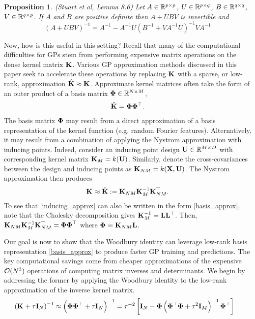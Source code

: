 \documentclass[12pt]{article}
\newtheorem{prop}{Proposition}
\begin{document}
\begin{prop} (Stuart et al, Lemma 8.6) \label{Woodbury}
Let $A \in \R^{p \times p}$, $U \in \R^{p \times q}$, $B \in \R^{q \times q}$, $V \in \R^{q \times p}$. If $A$ and $B$ are positive definite then $A + UBV$ is invertible 
and 
\[(A + UBV)^{-1} = A^{-1} - A^{-1} U\left(B^{-1} + VA^{-1}U\right)^{-1}VA^{-1}\]
\end{prop}
Now, how is this useful in this setting? Recall that many of the computational difficulties for GPs stem from performing expensive matrix operations on the dense 
kernel matrix $\kerMat$. Various GP approximation methods discussed in this paper seek to accelerate these operations by replacing $\kerMat$
with a sparse, or low-rank, approximation $\kerMatApprox \approx \kerMat$. Approximate kernel matrices often take the form of an outer product of a basis matrix 
$\kerBasisMat \in \R^{\Ndesign \times \NpseudoData}$,
\begin{align}
\kerMatApprox = \kerBasisMat \kerBasisMat^\top. \label{basis_approx}
\end{align}
The basis matrix $\kerBasisMat$ may result from a direct approximation of a basis representation of the kernel function (e.g. random Fourier features). Alternatively, it may result 
from a combination of applying the Nystrom approximation with inducing points. Indeed, consider an inducing point design $\designMatInducing \in \R^{\NpseudoData \times \inputDim}$ 
with corresponding kernel matrix $\kerMatInducing = \GPKer(\designMatInducing)$. Similarly, denote the cross-covariances between the design and inducing points as 
$\crossCovInducing = \GPKer(\designMat, \designMatInducing)$. The Nystrom approximation then produces
\begin{align}
\kerMat \approx \kerMatApprox := \crossCovInducing \kerMatInducing^{-1} \crossCovInducing^\top. \label{inducing_approx}
\end{align}
To see that \ref{inducing_approx} can also be written in the form \ref{basis_approx}, note that the Cholesky decomposition gives $\kerMatInducing^{-1} = \mathbf{L} \mathbf{L}^\top$. Then, 
$ \crossCovInducing \kerMatInducing^{-1} \crossCovInducing^\top = \kerBasisMat \kerBasisMat^\top$ where $\kerBasisMat = \crossCovInducing \mathbf{L}$.

Our goal is now to show that the Woodbury identity can leverage low-rank basis representation \ref{basis_approx} to produce faster GP training and predictions. The key computational savings 
come from cheaper approximations of the expensive $\BigO(\Ndesign^3)$ operations of computing matrix inverses and determinants. We begin by addressing the former by applying the 
Woodbury identity to the low-rank approximation of the inverse kernel matrix. 
\begin{align*}
\left(\kerMat + \nugget \I[\Ndesign] \right)^{-1} &\approx \left(\kerBasisMat \kerBasisMat^\top + \nugget \I[\Ndesign] \right)^{-1} = \nugget^{-2} \left[\I[\Ndesign] - \kerBasisMat \left(\kerBasisMat^\top \kerBasisMat + \nugget^2 \I[\NpseudoData] \right)^{-1} \kerBasisMat^\top \right] 	\end{align*}
\end{document}
